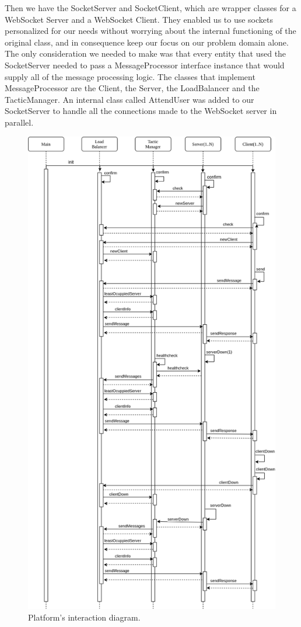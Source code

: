 \documentclass[12pt]{article}
\begin{document}
Then we have the SocketServer and SocketClient, which are wrapper classes for a WebSocket Server and a WebSocket Client.
They enabled us to use sockets personalized for our needs without worrying about the internal functioning of the original class, and in consequence keep our
focus on our problem domain alone.
The only consideration we needed to make was that every entity that used the SocketServer needed to pass a MessageProcessor interface instance that would supply
all of the message processing logic.
The classes that implement MessageProcessor are the Client, the Server, the LoadBalancer and the TacticManager.
An internal class called AttendUser was added to our SocketServer to handle all the connections made to the WebSocket server in parallel.

\begin{figure}[H]
  \centering
  \begin{minipage}{\textwidth}
    \centering
    \includegraphics[width=.75\linewidth]{img/pa3Interaction.png}
  \end{minipage}%
  \caption{Platform's interaction diagram.}
  \label{fig:pa3Interaction}
\end{figure}
\end{document}
